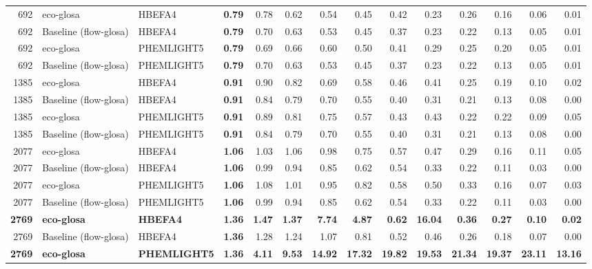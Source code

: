 \begin{table}[htb]
{\begin{tabular}{r l l r *{10}{r}}
    \midrule
    692 & \ac{eco-glosa} & HBEFA4 & \textbf{0.79} & 0.78 & 0.62 & 0.54 & 0.45 & 0.42 & 0.23 & 0.26 & 0.16 & 0.06 & 0.01\\
    692 & Baseline (\ac{flow-glosa}) & HBEFA4 & \textbf{0.79} & 0.70 & 0.63 & 0.53 & 0.45 & 0.37 & 0.23 & 0.22 & 0.13 & 0.05 & 0.01\\
    692 & \ac{eco-glosa} & PHEMLIGHT5 & \textbf{0.79} & 0.69 & 0.66 & 0.60 & 0.50 & 0.41 & 0.29 & 0.25 & 0.20 & 0.05 & 0.01\\
    692 & Baseline (\ac{flow-glosa}) & PHEMLIGHT5 & \textbf{0.79} & 0.70 & 0.63 & 0.53 & 0.45 & 0.37 & 0.23 & 0.22 & 0.13 & 0.05 & 0.01\\
    \midrule
    1385 & \ac{eco-glosa} & HBEFA4 & \textbf{0.91} & 0.90 & 0.82 & 0.69 & 0.58 & 0.46 & 0.41 & 0.25 & 0.19 & 0.10 & 0.02\\
    1385 & Baseline (\ac{flow-glosa}) & HBEFA4 & \textbf{0.91} & 0.84 & 0.79 & 0.70 & 0.55 & 0.40 & 0.31 & 0.21 & 0.13 & 0.08 & 0.00\\
    1385 & \ac{eco-glosa} & PHEMLIGHT5 & \textbf{0.91} & 0.89 & 0.81 & 0.75 & 0.57 & 0.43 & 0.43 & 0.22 & 0.22 & 0.09 & 0.05\\
    1385 & Baseline (\ac{flow-glosa}) & PHEMLIGHT5 & \textbf{0.91} & 0.84 & 0.79 & 0.70 & 0.55 & 0.40 & 0.31 & 0.21 & 0.13 & 0.08 & 0.00\\
    \midrule
    2077 & \ac{eco-glosa} & HBEFA4 & \textbf{1.06} & 1.03 & 1.06 & 0.98 & 0.75 & 0.57 & 0.47 & 0.29 & 0.16 & 0.11 & 0.05\\
    2077 & Baseline (\ac{flow-glosa}) & HBEFA4 & \textbf{1.06} & 0.99 & 0.94 & 0.85 & 0.62 & 0.54 & 0.33 & 0.22 & 0.11 & 0.03 & 0.00\\
    2077 & \ac{eco-glosa} & PHEMLIGHT5 & \textbf{1.06} & 1.08 & 1.01 & 0.95 & 0.82 & 0.58 & 0.50 & 0.33 & 0.16 & 0.07 & 0.03\\
    2077 & Baseline (\ac{flow-glosa}) & PHEMLIGHT5 & \textbf{1.06} & 0.99 & 0.94 & 0.85 & 0.62 & 0.54 & 0.33 & 0.22 & 0.11 & 0.03 & 0.00\\
    \midrule
    \textbf{2769} & \textbf{\ac{eco-glosa}} & \textbf{HBEFA4} & \textbf{1.36} & \textbf{1.47} & \textbf{1.37} & \textbf{7.74} & \textbf{4.87} & \textbf{0.62} & \textbf{16.04} & \textbf{0.36} & \textbf{0.27} & \textbf{0.10} & \textbf{0.02}\\
    2769 & Baseline (\ac{flow-glosa}) & HBEFA4 & \textbf{1.36} & 1.28 & 1.24 & 1.07 & 0.81 & 0.52 & 0.46 & 0.26 & 0.18 & 0.07 & 0.00\\
    \textbf{2769} & \textbf{\ac{eco-glosa}} & \textbf{PHEMLIGHT5} & \textbf{1.36} & \textbf{4.11} & \textbf{9.53} & \textbf{14.92} & \textbf{17.32} & \textbf{19.82} & \textbf{19.53} & \textbf{21.34} & \textbf{19.37} & \textbf{23.11} & \textbf{13.16}\\

\end{tabular}}
\end{table}
